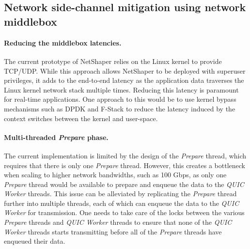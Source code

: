 \subsection{Network side-channel mitigation using network middlebox}
\label{subsec:future-work-netshaper}

\paragraph{Reducing the middlebox latencies.}
The current prototype of NetShaper relies on the Linux kernel to provide TCP/UDP. 
While this approach allows NetShaper to be deployed with superuser privileges, it adds to the end-to-end latency as the application data traverses the Linux kernel network stack multiple times.
Reducing this latency is paramount for real-time applications.
One approach to this would be to use kernel bypass mechanisms such as DPDK \cite{dpdk} and F-Stack \cite{fstack} to reduce the latency induced by the context switches between the kernel and user-space.

\paragraph{Multi-threaded \textit{Prepare} phase.}
The current implementation is limited by the design of the \textit{Prepare} thread, which requires that there is only one \textit{Prepare} thread.
However, this creates a bottleneck when scaling to higher network bandwidths, such as 100 Gbps, as only one \textit{Prepare} thread would be available to prepare and enqueue the data to the \textit{QUIC Worker} threads.
This issue can be alleviated by replicating the \textit{Prepare} thread further into multiple threads, each of which can enqueue the data to the \textit{QUIC Worker} for transmission.
One needs to take care of the locks between the various \textit{Prepare} threads and \textit{QUIC Worker} threads to ensure that none of the \textit{QUIC Worker} threads starts transmitting before all of the \textit{Prepare} threads have enqueued their data.

